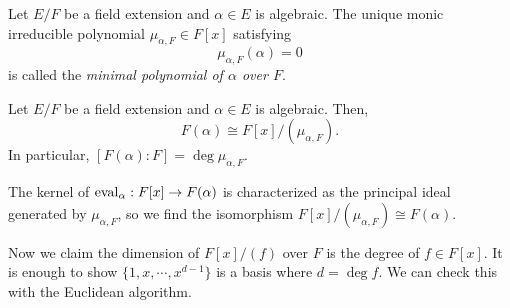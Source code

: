 \documentclass{../exp}
\begin{document}
\begin{defn}
Let $E/F$ be a field extension and $\alpha\in E$ is algebraic.
The unique monic irreducible polynomial $\mu_{\alpha,F}\in F[x]$ satisfying 
\[\mu_{\alpha,F}(\alpha)=0\]
is called the \emph{minimal polynomial of $\alpha$ over $F$}.
\end{defn}
\begin{thm}
Let $E/F$ be a field extension and $\alpha\in E$ is algebraic.
Then,
\[F(\alpha)\cong F[x]/(\mu_{\alpha,F}).\]
In particular, $[F(\alpha):F]=\deg\mu_{\alpha,F}$.
\end{thm}
\begin{pf}
The kernel of $\eval_\alpha:F[x]\to F(\alpha)$ is characterized as the principal ideal generated by $\mu_{\alpha,F}$, so we find the isomorphism $F[x]/(\mu_{\alpha,F})\cong F(\alpha)$.

Now we claim the dimension of $F[x]/(f)$ over $F$ is the degree of $f\in F[x]$.
It is enough to show $\{1,x,\cdots,x^{d-1}\}$ is a basis where $d=\deg f$.
We can check this with the Euclidean algorithm.
\end{pf}
\end{document}
